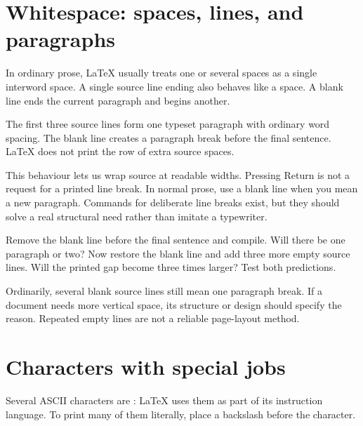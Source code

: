 \section{Whitespace: spaces, lines, and paragraphs}

In ordinary prose, \LaTeX{} usually treats one or several spaces as a single
interword space. A single source line ending also behaves like a space. A
blank line ends the current paragraph and begins another.


\expectedoutput

The first three source lines form one typeset paragraph with ordinary word
spacing. The blank line creates a paragraph break before the final sentence.
\LaTeX{} does not print the row of extra source spaces.

This behaviour lets us wrap source at readable widths. Pressing Return is not
a request for a printed line break. In normal prose, use a blank line when you
mean a new paragraph. Commands for deliberate line breaks exist, but they
should solve a real structural need rather than imitate a typewriter.

\begin{pausepredict}
Remove the blank line before the final sentence and compile. Will there be one
paragraph or two? Now restore the blank line and add three more empty source
lines. Will the printed gap become three times larger? Test both predictions.
\end{pausepredict}

Ordinarily, several blank source lines still mean one paragraph break. If a
document needs more vertical space, its structure or design should specify the
reason. Repeated empty lines are not a reliable page-layout method.

\section{Characters with special jobs}

Several ASCII characters are : \LaTeX{} uses them as
part of its instruction language. To print many of them literally, place a
backslash before the character.

